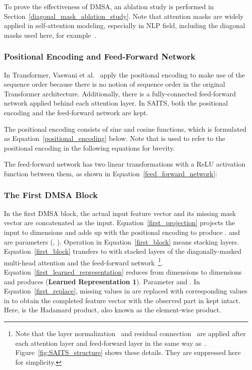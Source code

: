 \documentclass{article}
\begin{document}
To prove the effectiveness of DMSA, an ablation study is performed in Section~\ref{diagonal_mask_ablation_study}. Note that attention masks are widely applied in self-attention modeling, especially in NLP field, including the diagonal masks used here, for example~\cite{Shen2018DISAN, Yang2019XLNet, Shin2020FA}.

\subsubsection{Positional Encoding and Feed-Forward Network} \label{SAITS: PE and FFN}
In Transformer, Vaswani et al.~\cite{Vaswani2017SelfAttention} apply the positional encoding to make use of the sequence order because there is no notion of sequence order in the original Transformer architecture. Additionally, there is a fully-connected feed-forward network applied behind each attention layer. In SAITS, both the positional encoding and the feed-forward network are kept. 

The positional encoding consists of sine and cosine functions, which is formulated as Equation~\ref{positional_encoding} below. Note that  is used to refer to the positional encoding in the following equations for brevity.



The feed-forward network has two linear transformations with a ReLU activation function between them, as shown in Equation~\ref{feed_forward_network}:



\subsubsection{The First DMSA Block} \label{SAITS: the 1st block}



 
In the first DMSA block, the actual input feature vector  and its missing mask vector  are concatenated as the input. Equation~\ref{first_projection} projects the input to  dimensions and adds up with the positional encoding  to produce .  and  are parameters (, ). Operation  in Equation~\ref{first_block} means stacking  layers. Equation~\ref{first_block} transfers  to  with  stacked layers of the diagonally-masked multi-head attention and the feed-forward network~\footnote{Note that the layer normalization~\cite{Ba2016LN} and residual connection~\cite{He2016ResNet} are applied after each attention layer and feed-forward layer in the same way as~\cite{Vaswani2017SelfAttention}. Figure~\ref{fig:SAITS_structure} shows these details. They are suppressed here for simplicity.}. Equation~\ref{first_learned_representation} reduces  from  dimensions to  dimensions and produces  (\textbf{Learned Representation 1}). Parameter  and . In Equation~\ref{first_replace}, missing values in  are replaced with corresponding values in  to obtain the completed feature vector  with the observed part in  kept intact. Here,  is the Hadamard product, also known as the element-wise product.
\end{document}
